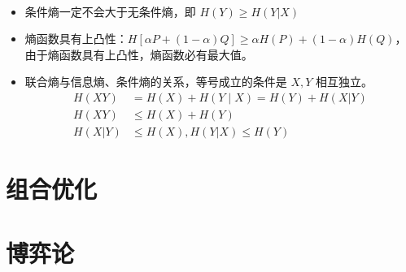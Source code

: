 \begin{remark}
\begin{itemize}
\begin{gather*}
        \end{gather*}
        \item 条件熵一定不会大于无条件熵，即 $H(Y) \ge H(Y | X)$
        \item 熵函数具有上凸性：$H[\alpha P + (1 - \alpha)Q] \ge \alpha H(P) + (1 - \alpha)H(Q)$，由于熵函数具有上凸性，熵函数必有最大值。
        \item 联合熵与信息熵、条件熵的关系，等号成立的条件是 $X,Y$ 相互独立。\begin{align*}
            H(X Y)&=H(X)+H(Y \mid X)=H(Y)+H(X | Y) \\
            H(X Y) &\leq H(X)+H(Y) \\
            H(X | Y) &\leq H(X), H(Y | X) \leq H(Y)
        \end{align*}
    \end{itemize}
\end{remark}

\section{组合优化}
\section{博弈论}

